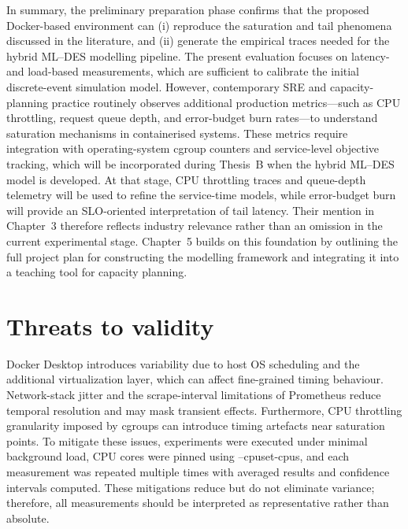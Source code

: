 In summary, the preliminary preparation phase confirms that the proposed
Docker-based environment can (i) reproduce the saturation and tail
phenomena discussed in the literature, and (ii) generate the empirical
traces needed for the hybrid ML--DES modelling pipeline. 
The present evaluation focuses on latency- and load-based measurements, which are sufficient to calibrate the initial discrete-event simulation model. However, contemporary SRE and capacity-planning practice routinely observes additional production metrics—such as CPU throttling, request queue depth, and error-budget burn rates—to understand saturation mechanisms in containerised systems. These metrics require integration with operating-system cgroup counters and service-level objective tracking, which will be incorporated during Thesis~B when the hybrid ML--DES model is developed. At that stage, CPU throttling traces and queue-depth telemetry will be used to refine the service-time models, while error-budget burn will provide an SLO-oriented interpretation of tail latency. Their mention in Chapter~3 therefore reflects industry relevance rather than an omission in the current experimental stage.
Chapter~5
builds on this foundation by outlining the full project plan for
constructing the modelling framework and integrating it into a teaching
tool for capacity planning.

\section{Threats to validity}

Docker Desktop introduces variability due to host OS scheduling and the additional virtualization layer, which can affect fine-grained timing behaviour. Network-stack jitter and the scrape-interval limitations of Prometheus reduce temporal resolution and may mask transient effects. Furthermore, CPU throttling granularity imposed by cgroups can introduce timing artefacts near saturation points. To mitigate these issues, experiments were executed under minimal background load, CPU cores were pinned using --cpuset-cpus, and each measurement was repeated multiple times with averaged results and confidence intervals computed. These mitigations reduce but do not eliminate variance; therefore, all measurements should be interpreted as representative rather than absolute.